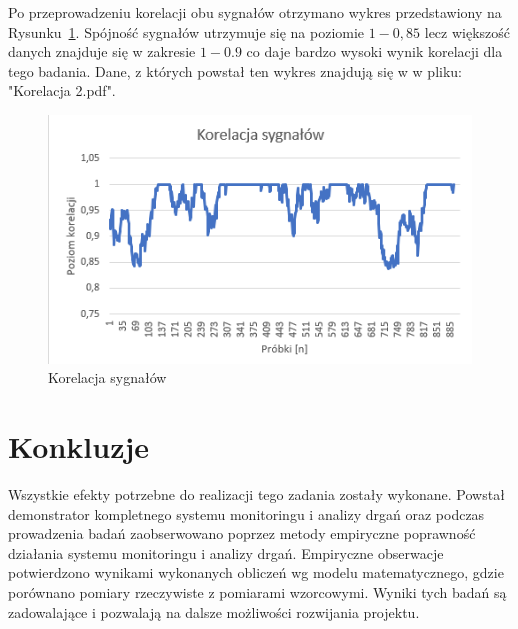 \documentclass[a4paper, 12pt]{mwart}
\begin{document}
Po przeprowadzeniu korelacji obu sygnałów otrzymano wykres przedstawiony na Rysunku~\ref{fig:korelacja2}. Spójność sygnałów utrzymuje się na poziomie $ 1 - 0,85 $ lecz większość danych znajduje się w zakresie $ 1 - 0.9 $ co daje bardzo wysoki wynik korelacji dla tego badania. Dane, z których powstał ten wykres znajdują się w w pliku: "Korelacja 2.pdf".

\begin{figure}[h!]
	\centering
	\includegraphics[width=0.9\linewidth]{assets/korelacja2}
	\caption{Korelacja sygnałów}
	\label{fig:korelacja2}
\end{figure}


\pagebreak
\section{Konkluzje}
Wszystkie efekty potrzebne do realizacji tego zadania zostały wykonane. Powstał demonstrator kompletnego systemu monitoringu i analizy drgań oraz podczas prowadzenia badań zaobserwowano poprzez metody empiryczne poprawność działania systemu monitoringu i analizy drgań. Empiryczne obserwacje potwierdzono wynikami wykonanych obliczeń wg modelu matematycznego, gdzie porównano pomiary rzeczywiste z pomiarami wzorcowymi. Wyniki tych badań są zadowalające i pozwalają na dalsze możliwości rozwijania projektu. 
\end{document}
